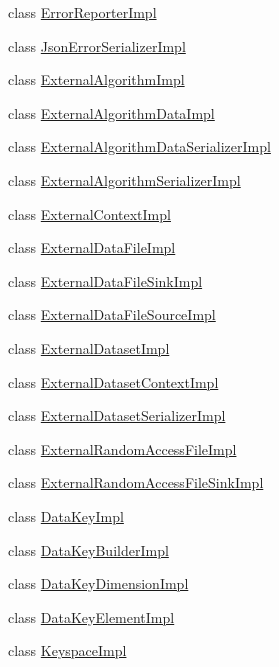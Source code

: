 \begin{DoxyCompactItemize}
\item 
class \hyperlink{classBUSBOY_1_1ErrorReporterImpl}{ErrorReporterImpl}
\item 
class \hyperlink{classBUSBOY_1_1JsonErrorSerializerImpl}{JsonErrorSerializerImpl}
\item 
class \hyperlink{classBUSBOY_1_1ExternalAlgorithmImpl}{ExternalAlgorithmImpl}
\item 
class \hyperlink{classBUSBOY_1_1ExternalAlgorithmDataImpl}{ExternalAlgorithmDataImpl}
\item 
class \hyperlink{classBUSBOY_1_1ExternalAlgorithmDataSerializerImpl}{ExternalAlgorithmDataSerializerImpl}
\item 
class \hyperlink{classBUSBOY_1_1ExternalAlgorithmSerializerImpl}{ExternalAlgorithmSerializerImpl}
\item 
class \hyperlink{classBUSBOY_1_1ExternalContextImpl}{ExternalContextImpl}
\item 
class \hyperlink{classBUSBOY_1_1ExternalDataFileImpl}{ExternalDataFileImpl}
\item 
class \hyperlink{classBUSBOY_1_1ExternalDataFileSinkImpl}{ExternalDataFileSinkImpl}
\item 
class \hyperlink{classBUSBOY_1_1ExternalDataFileSourceImpl}{ExternalDataFileSourceImpl}
\item 
class \hyperlink{classBUSBOY_1_1ExternalDatasetImpl}{ExternalDatasetImpl}
\item 
class \hyperlink{classBUSBOY_1_1ExternalDatasetContextImpl}{ExternalDatasetContextImpl}
\item 
class \hyperlink{classBUSBOY_1_1ExternalDatasetSerializerImpl}{ExternalDatasetSerializerImpl}
\item 
class \hyperlink{classBUSBOY_1_1ExternalRandomAccessFileImpl}{ExternalRandomAccessFileImpl}
\item 
class \hyperlink{classBUSBOY_1_1ExternalRandomAccessFileSinkImpl}{ExternalRandomAccessFileSinkImpl}
\item 
class \hyperlink{classBUSBOY_1_1DataKeyImpl}{DataKeyImpl}
\item 
class \hyperlink{classBUSBOY_1_1DataKeyBuilderImpl}{DataKeyBuilderImpl}
\item 
class \hyperlink{classBUSBOY_1_1DataKeyDimensionImpl}{DataKeyDimensionImpl}
\item 
class \hyperlink{classBUSBOY_1_1DataKeyElementImpl}{DataKeyElementImpl}
\item 
class \hyperlink{classBUSBOY_1_1KeyspaceImpl}{KeyspaceImpl}
\item 

\end{DoxyCompactItemize}
